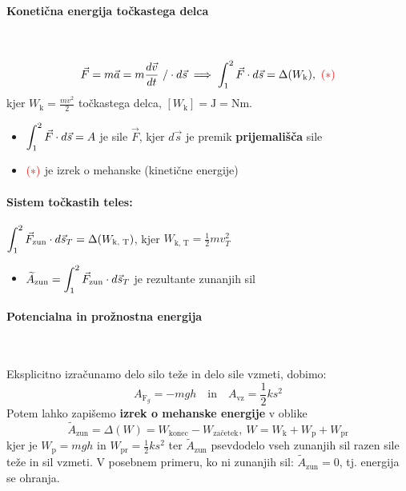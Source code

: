 \paragraph{Konetična energija točkastega delca} \ 

\[\vec{F} = m \vec{a} = m \frac{d \vec{v}}{dt} \ / \cdot d \vec{s} \implies \int_{1}^{2} \vec{F} \cdot d \vec{s} = \Delta(W_\text{k}), \ \textcolor{red}{(*)}\]
kjer \(W_\text{k} = \frac{mv^2}{2}\)  točkastega delca, \([W_\text{k}] = \text{J} = \text{Nm}\).
\begin{itemize}
    \item \(\displaystyle \int_{1}^{2} \vec{F} \cdot d \vec{s} = A\) je  sile \(\vec{F}\), kjer \(d \vec{s}\) je premik \textbf{prijemališča} sile
    \item \(\textcolor{red}{(*)}\) je izrek o mehanske (kinetične energije)
\end{itemize}

\paragraph{Sistem točkastih teles: } \(\displaystyle \int_{1}^{2} \vec{F}_\text{zun} \cdot d \vec{s}_T = \Delta(W_\text{k, T})\), kjer \(W_\text{k, T}= \frac{1}{2} mv^2_T\) 
\begin{itemize}
    \item \(\displaystyle \widetilde{A}_\text{zun} = \int_{1}^{2} \vec{F}_\text{zun} \cdot d \vec{s}_T \) je  rezultante zunanjih sil
\end{itemize}

\paragraph{Potencialna in prožnostna energija} \ 

Eksplicitno izračunamo delo silo teže in delo sile vzmeti, dobimo:
\[A_{\text{F}_g} = - mgh \quad \text{in} \quad A_\text{vz} = \frac{1}{2}k s^2\]
Potem lahko zapišemo \textbf{izrek o mehanske energije} v oblike
\[\boxed{\widetilde{A}_\text{zun} = \Delta(W) = W_\text{konec} - W_\text{začetek}, \ W = W_\text{k} + W_\text{p} + W_\text{pr}}\]
kjer je \(W_\text{p} = mgh\)  in \(W_\text{pr} = \frac{1}{2} k s^2\)  ter \(\widetilde{A}_\text{zun}\) psevdodelo vseh zunanjih sil razen sile teže in sil vzmeti. V posebnem primeru, ko ni zunanjih sil: \(\widetilde{A}_\text{zun} = 0\), tj. energija se ohranja.

